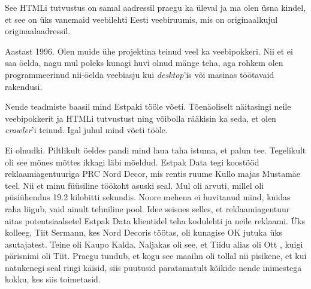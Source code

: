 
See HTMLi tutvustus on samal aadressil praegu ka üleval ja ma 
olen üsna kindel, et see on üks vanemaid veebilehti 
Eesti veebiruumis, mis on originaalkujul originaalaadressil. 


Aastast 1996. Olen muide ühe projektina teinud veel ka veebipokkeri. Nii et ei saa öelda, nagu mul poleks kunagi huvi olnud 
mänge teha, aga rohkem olen programmeerinud nii-öelda 
veebiasju kui \emph{desktop}'is või masinas töötavaid rakendusi. 

Nende teadmiste baasil mind Estpaki tööle võeti. Tõenäoliselt 
näitasingi neile veebipokkerit ja 
HTMLi tutvustust ning võibolla rääkisin ka seda, et olen 
\emph{crawler}'i teinud. Igal juhul mind võeti tööle.


Ei olnudki. Piltlikult öeldes pandi mind laua taha istuma, et palun tee. 
Tegelikult oli see mõnes mõttes ikkagi läbi mõeldud. Estpak Data tegi koostööd reklaamiagentuuriga PRC Nord Decor, mis rentis ruume Kullo majas 
Mustamäe teel. Nii et minu füüsiline töökoht asuski seal. Mul oli arvuti, millel oli püsiühendus 19.2 
kilobitti sekundis. Noore mehena ei huvitanud mind, kuidas raha liigub, vaid ainult 
tehniline pool. Idee seisnes selles, et reklaamiagentuur aitas 
potentsiaalsetel Estpak Data klientidel teha kodulehti ja neile 
reklaami. Üks kolleeg, Tiit Sermann, kes Nord Decoris töötas, oli kunagise 
OK jutuka üks asutajatest. Teine oli
Kaupo Kalda. Naljakas oli see, et Tiidu alias oli Ott , kuigi
pärisnimi oli Tiit. Praegu tundub, et kogu see 
maailm oli tollal nii pisikene, et kui natukenegi seal ringi 
käisid, siis puutusid paratamatult kõikide nende inimestega kokku, 
kes siis toimetasid.


